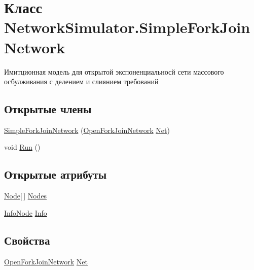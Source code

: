 \hypertarget{class_network_simulator_1_1_simple_fork_join_network}{}\section{Класс Network\+Simulator.\+Simple\+Fork\+Join\+Network}
\label{class_network_simulator_1_1_simple_fork_join_network}


Имитционная модель для открытой экспоненциальносй сети массового осбулживания с делением и слиянием требований  


\subsection*{Открытые члены}
\begin{DoxyCompactItemize}
\item 
\hyperlink{class_network_simulator_1_1_simple_fork_join_network_ac9146ffe35893f3a461c9a4e1128809c}{Simple\+Fork\+Join\+Network} (\hyperlink{class_networks_1_1_open_fork_join_network}{Open\+Fork\+Join\+Network} \hyperlink{class_network_simulator_1_1_simple_fork_join_network_ab7e5ce5b98f06c7f436e99aa3ee3ecb0}{Net})
\item 
void \hyperlink{class_network_simulator_1_1_simple_fork_join_network_a63efbd5daeebe6aa0af34de06454df87}{Run} ()
\end{DoxyCompactItemize}
\subsection*{Открытые атрибуты}
\begin{DoxyCompactItemize}
\item 
\hyperlink{class_network_simulator_1_1_node}{Node}\mbox{[}$\,$\mbox{]} \hyperlink{class_network_simulator_1_1_simple_fork_join_network_a4fcb433275926794391a8665b613e35a}{Nodes}
\item 
\hyperlink{class_network_simulator_1_1_info_node}{Info\+Node} \hyperlink{class_network_simulator_1_1_simple_fork_join_network_a066c8726b2e06ff097ceac9bc5da6b06}{Info}
\end{DoxyCompactItemize}
\subsection*{Свойства}
\begin{DoxyCompactItemize}
\item 
\hyperlink{class_networks_1_1_open_fork_join_network}{Open\+Fork\+Join\+Network} \hyperlink{class_network_simulator_1_1_simple_fork_join_network_ab7e5ce5b98f06c7f436e99aa3ee3ecb0}{Net}
\end{DoxyCompactItemize}


